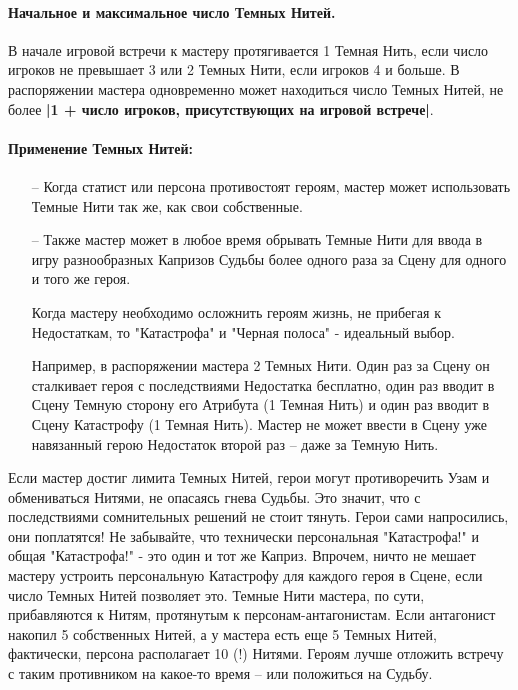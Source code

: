 \paragraph{Начальное и максимальное число Темных Нитей.}
В начале игровой встречи к мастеру протягивается 1 Темная Нить, если число игроков не превышает 3 или 2 Темных Нити, если игроков 4 и больше.
\newline В распоряжении мастера одновременно может находиться число Темных Нитей, не более  \textbf{|1 + число игроков, присутствующих на игровой встрече|}.

\paragraph{Применение Темных Нитей:}
\begin{itemize}
    \item[--] Когда статист или персона противостоят героям, мастер может использовать Темные Нити так же, как свои собственные.
    \item[--] Также мастер может в любое время обрывать Темные Нити для ввода в игру разнообразных Капризов Судьбы более одного раза за Сцену для одного и того же героя.
    \begin{tcolorbox}
        Когда мастеру необходимо осложнить героям жизнь, не прибегая к Недостаткам, то "Катастрофа" и "Черная полоса" - идеальный выбор.
    \end{tcolorbox}
    Например, в распоряжении мастера 2 Темных Нити. Один раз за Сцену он сталкивает героя с последствиями Недостатка бесплатно, один раз вводит в Сцену Темную сторону его Атрибута (1 Темная Нить) и один раз вводит в Сцену Катастрофу (1 Темная Нить). Мастер не может ввести в Сцену уже навязанный герою Недостаток второй раз – даже за Темную Нить.
\end{itemize}
Если мастер достиг лимита Темных Нитей, герои могут противоречить Узам и обмениваться Нитями, не опасаясь гнева Судьбы. Это значит, что с последствиями сомнительных решений не стоит тянуть. Герои сами напросились, они поплатятся!
\newline Не забывайте, что технически персональная "Катастрофа!" и общая "Катастрофа!" - это один и тот же Каприз. Впрочем, ничто не мешает мастеру устроить персональную Катастрофу для каждого героя в Сцене, если число Темных Нитей позволяет это.
\newline Темные Нити мастера, по сути, прибавляются к Нитям, протянутым к персонам-антагонистам. Если антагонист накопил 5 собственных Нитей, а у мастера есть еще 5 Темных Нитей, фактически, персона располагает 10 (!) Нитями. Героям лучше отложить встречу с таким противником на какое-то время – или положиться на Судьбу.

